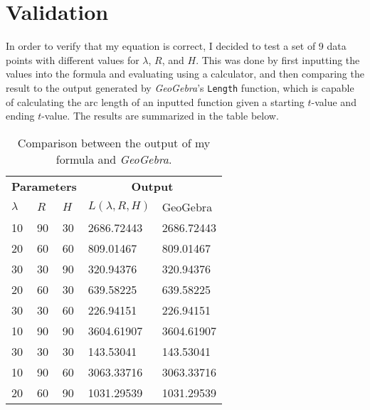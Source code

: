 \section{Validation}

In order to verify that my equation is correct, I decided to test a set of 9 data points with different values for $\lambda$, $R$, and $H$. This was done by first inputting the values into the formula and evaluating using a calculator, and then comparing the result to the output generated by \emph{GeoGebra}'s \texttt{Length} function, which is capable of calculating the arc length of an inputted function given a starting $t$-value and ending $t$-value. The results are summarized in the table below.

\begin{table}[H]
    \centering
    \singlespacing
    \setlength{\tabcolsep}{18pt}
    \begin{tabular}{lllll}
        \toprule
        \multicolumn{3}{c}{\textbf{Parameters}} & \multicolumn{2}{c}{\textbf{Output}}                                         \\
        \cmidrule(r{4pt}){1-3} \cmidrule(l){4-5}
        $\lambda$                               & $R$                                 & $H$ & $L(\lambda, R, H)$ & GeoGebra   \\
        \midrule
        10                                      & 90                                  & 30  & 2686.72443         & 2686.72443 \\
        20                                      & 60                                  & 60  & 809.01467          & 809.01467  \\
        30                                      & 30                                  & 90  & 320.94376          & 320.94376  \\
        20                                      & 60                                  & 30  & 639.58225          & 639.58225  \\
        30                                      & 30                                  & 60  & 226.94151          & 226.94151  \\
        10                                      & 90                                  & 90  & 3604.61907         & 3604.61907 \\
        30                                      & 30                                  & 30  & 143.53041          & 143.53041  \\
        10                                      & 90                                  & 60  & 3063.33716         & 3063.33716 \\
        20                                      & 60                                  & 90  & 1031.29539         & 1031.29539 \\
        \bottomrule
    \end{tabular}
    \caption{Comparison between the output of my formula and \emph{GeoGebra}.}
\end{table}

